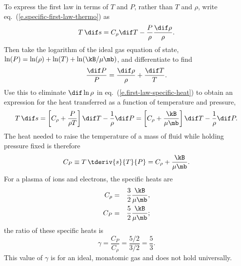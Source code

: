 \begin{sidebar}
To express the first law in terms of $T$ and $P$, rather than $T$ and $\rho$, write eq.~(\ref{e.specific-first-law-thermo}) as
\begin{equation}\label{e.first-law-specific-heat}
T\,\dif s = C_{\rho}\dif T - \frac{P}{\rho}\frac{\dif\rho}{\rho} .
\end{equation}
Then take the logarithm of the ideal gas equation of state, $\ln (P) = \ln(\rho) + \ln (T) + \ln (\kB/\mu\mb)$, and differentiate to find
\[ \frac{\dif P}{P} = \frac{\dif\rho}{\rho} + \frac{\dif T}{T}. \]
Use this to eliminate $\dif\ln\rho$ in eq.~(\ref{e.first-law-specific-heat})
to obtain an expression for the heat transferred as a function of temperature and pressure,
\begin{equation}\label{e.first-law-pressure-temperature}
T\,\dif s = \left[C_{\rho} + \frac{P}{\rho T}\right]\dif T - \frac{1}{\rho}\dif P
	 = \left[C_{\rho} + \frac{\kB}{\mu\mb}\right]\dif T - \frac{1}{\rho}\dif P.
\end{equation}
The heat needed to raise the temperature of a mass of fluid while holding pressure fixed is therefore
\begin{equation}\label{e.CP}
C_{P}\equiv T\,\tderiv{s}{T}{P} = C_{\rho} + \frac{\kB}{\mu\mb}.
\end{equation}
For a plasma of ions and electrons, the specific heats are
\begin{eqnarray}
C_\rho &=& \frac{3}{2}\frac{\kB}{\mu\mb}  \label{e.specific-heat-density},\\
C_P    &=& \frac{5}{2}\frac{\kB}{\mu\mb}; \label{e.specific-heat-pressure}
\end{eqnarray}
the ratio of these specific heats is
\begin{equation}\label{e.gamma}
    \gamma = \frac{C_P}{C_\rho} = \frac{5/2}{3/2} = \frac{5}{3}.
\end{equation}
This value of $\gamma$ is for an ideal, monatomic gas and does not hold universally.
\end{sidebar}

